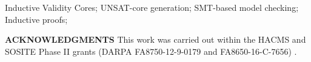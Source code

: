 \documentclass[10pt, conference]{IEEEtran}
\begin{document}
\begin{IEEEkeywords}
Inductive Validity Cores; UNSAT-core generation; SMT-based model checking; Inductive proofs;
\end{IEEEkeywords}

\IEEEpeerreviewmaketitle


%










%


%
%
%

%



\vspace{0.08in}
\textbf{ACKNOWLEDGMENTS} This work was carried out within the HACMS and SOSITE Phase II grants (DARPA FA8750-12-9-0179 and FA8650-16-C-7656) .
\vspace{0.08in}





%
%


\end{document}
